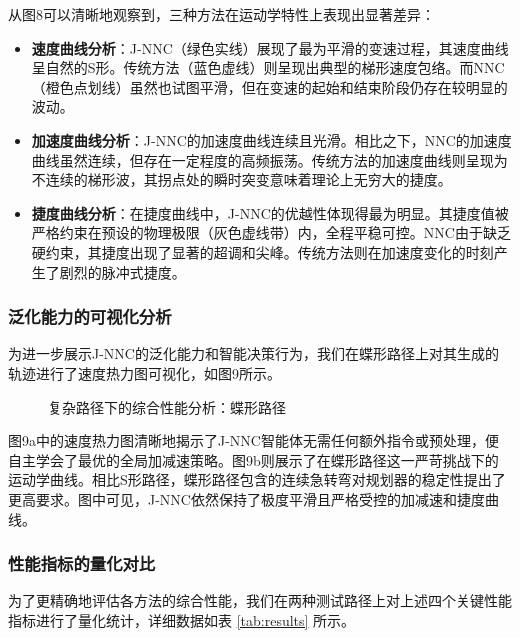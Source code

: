 \documentclass[preprint,12pt]{elsarticle}
\begin{document}
从图8可以清晰地观察到，三种方法在运动学特性上表现出显著差异：
\begin{itemize}
    \item \textbf{速度曲线分析}：J-NNC（绿色实线）展现了最为平滑的变速过程，其速度曲线呈自然的S形。传统方法（蓝色虚线）则呈现出典型的梯形速度包络。而NNC（橙色点划线）虽然也试图平滑，但在变速的起始和结束阶段仍存在较明显的波动。
    \item \textbf{加速度曲线分析}：J-NNC的加速度曲线连续且光滑。相比之下，NNC的加速度曲线虽然连续，但存在一定程度的高频振荡。传统方法的加速度曲线则呈现为不连续的梯形波，其拐点处的瞬时突变意味着理论上无穷大的捷度。
    \item \textbf{捷度曲线分析}：在捷度曲线中，J-NNC的优越性体现得最为明显。其捷度值被严格约束在预设的物理极限（灰色虚线带）内，全程平稳可控。NNC由于缺乏硬约束，其捷度出现了显著的超调和尖峰。传统方法则在加速度变化的时刻产生了剧烈的脉冲式捷度。
\end{itemize}

\subsubsection{泛化能力的可视化分析}
为进一步展示J-NNC的泛化能力和智能决策行为，我们在蝶形路径上对其生成的轨迹进行了速度热力图可视化，如图9所示。

\begin{figure}[htbp]
    \centering
    \caption{复杂路径下的综合性能分析：蝶形路径}
    \label{fig:curve_butterfly}
\end{figure}

图9a中的速度热力图清晰地揭示了J-NNC智能体无需任何额外指令或预处理，便自主学会了最优的全局加减速策略。图9b则展示了在蝶形路径这一严苛挑战下的运动学曲线。相比S形路径，蝶形路径包含的连续急转弯对规划器的稳定性提出了更高要求。图中可见，J-NNC依然保持了极度平滑且严格受控的加减速和捷度曲线。

\subsubsection{性能指标的量化对比}
为了更精确地评估各方法的综合性能，我们在两种测试路径上对上述四个关键性能指标进行了量化统计，详细数据如表 \ref{tab:results} 所示。
\end{document}
